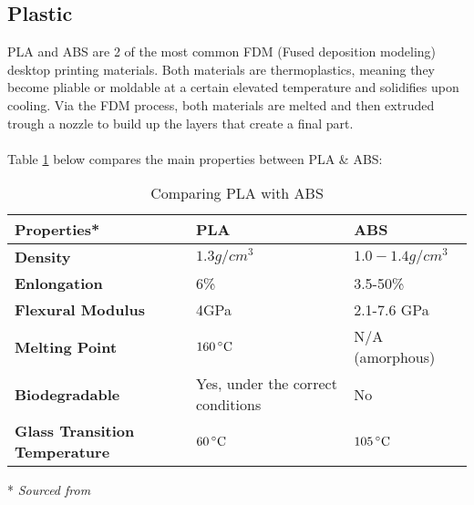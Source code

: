 \documentclass[a4paper]{article}
\begin{document}
\subsection{Plastic}
PLA and ABS are 2 of the most common FDM (Fused deposition modeling) desktop printing materials.
Both materials are thermoplastics, meaning they become pliable or moldable at a certain elevated temperature and solidifies upon cooling.
Via the FDM process, both materials are melted and then extruded trough a nozzle to build up the layers that create a final part.
\\ \\
Table \ref{tab:pla-abs} below compares the main properties between PLA \& ABS:
\begin{table}[ht]
    \centering
    \begin{threeparttable}
        \begin{tabular}[t]{>{\bfseries}l l l}
            \toprule
            Properties* & \textbf{PLA} & \textbf{ABS} \\
            \midrule
            Density & $1.3 g/cm^3$ & $1.0 - 1.4 g/cm^3$ \\
            Enlongation & 6\% & 3.5-50\% \\ %
            Flexural Modulus & 4GPa & 2.1-7.6 GPa \\ %
            Melting Point & $160\,^{\circ}{\rm C}$ & N/A (amorphous) \\
            Biodegradable & Yes, under the correct conditions & No \\
            Glass Transition Temperature & $60\,^{\circ}{\rm C}$ & $105\,^{\circ}{\rm C}$ \\ %
            \bottomrule
        \end{tabular}
        \caption{Comparing PLA with ABS}
        \label{tab:pla-abs}
        \begin{tablenotes}
            \item[*] \textit{Sourced from \cite{MakeItFrom}}
        \end{tablenotes}    
    \end{threeparttable}    
\end{table}

\newpage


\end{document}
